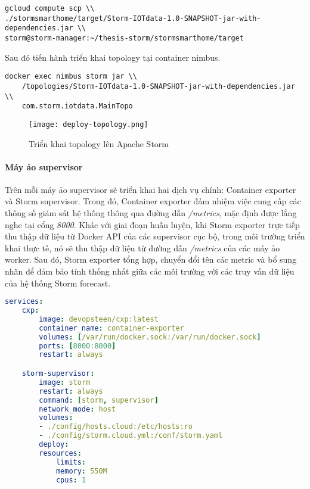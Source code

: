 \begin{verbatim}
gcloud compute scp \\
./stormsmarthome/target/Storm-IOTdata-1.0-SNAPSHOT-jar-with-dependencies.jar \\
storm@storm-manager:~/thesis-storm/stormsmarthome/target   
\end{verbatim}

Sau đó tiến hành triển khai topology tại container nimbus.

\begin{verbatim}
docker exec nimbus storm jar \\
    /topologies/Storm-IOTdata-1.0-SNAPSHOT-jar-with-dependencies.jar \\
    com.storm.iotdata.MainTopo
\end{verbatim}

\begin{figure}
    \centering
    \texttt{[image: deploy-topology.png]}
    \caption{Triển khai topology lên Apache Storm}
\end{figure}

\paragraph{Máy ảo supervisor}

Trên mỗi máy ảo supervisor sẽ triển khai hai dịch vụ chính: Container exporter \autocite{shayan_ghani_container_exporter} và Storm supervisor. Trong đó, Container exporter đảm nhiệm việc cung cấp các thông số giám sát hệ thống thông qua đường dẫn \textit{/metrics}, mặc định được lắng nghe tại cổng \textit{8000}. Khác với giai đoạn huấn luyện, khi Storm exporter trực tiếp thu thập dữ liệu từ Docker API của các supervisor cục bộ, trong môi trường triển khai thực tế, nó sẽ thu thập dữ liệu từ đường dẫn \textit{/metrics} của các máy ảo worker. Sau đó, Storm exporter tổng hợp, chuyển đổi tên các metric và bổ sung nhãn để đảm bảo tính thống nhất giữa các môi trường với các truy vấn dữ liệu của hệ thống Storm forecast.

\begin{lstlisting}[language=yaml, caption={Cấu hình các dịch vụ chạy trên máy ảo supervisor}]
services:
    cxp:
        image: devopsteen/cxp:latest
        container_name: container-exporter
        volumes: [/var/run/docker.sock:/var/run/docker.sock]
        ports: [8000:8000]
        restart: always

    storm-supervisor:
        image: storm
        restart: always
        command: [storm, supervisor]
        network_mode: host
        volumes:
        - ./config/hosts.cloud:/etc/hosts:ro
        - ./config/storm.cloud.yml:/conf/storm.yaml
        deploy:
        resources:
            limits:
            memory: 550M
            cpus: 1
\end{lstlisting}

